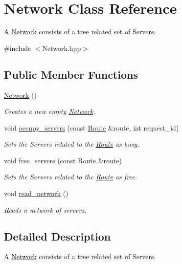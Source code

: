 \hypertarget{class_network}{\section{Network Class Reference}
\label{de/de1/class_network}
}


A \hyperlink{class_network}{Network} consists of a tree related set of Servers.  




{\ttfamily \#include $<$Network.\-hpp$>$}

\subsection*{Public Member Functions}
\begin{DoxyCompactItemize}
\item 
\hyperlink{class_network_a3cc2fb4f8fa4d507077e8da85ce5a1c8}{Network} ()
\begin{DoxyCompactList}\small\item\em Creates a new empty \hyperlink{class_network}{Network}. \end{DoxyCompactList}\item 
void \hyperlink{class_network_a3b6af9795d37156f9fa6e0fa1441bd99}{occupy\-\_\-servers} (const \hyperlink{class_route}{Route} \&route, int request\-\_\-id)
\begin{DoxyCompactList}\small\item\em Sets the Servers related to the \hyperlink{class_route}{Route} as busy. \end{DoxyCompactList}\item 
void \hyperlink{class_network_ac66a15e2a733d4cce9974d2e2921552f}{free\-\_\-servers} (const \hyperlink{class_route}{Route} \&route)
\begin{DoxyCompactList}\small\item\em Sets the Servers related to the \hyperlink{class_route}{Route} as free. \end{DoxyCompactList}\item 
void \hyperlink{class_network_a12d28a1bc2ea301c8fef6054838156be}{read\-\_\-network} ()
\begin{DoxyCompactList}\small\item\em Reads a network of servers. \end{DoxyCompactList}\end{DoxyCompactItemize}


\subsection{Detailed Description}
A \hyperlink{class_network}{Network} consists of a tree related set of Servers. 


